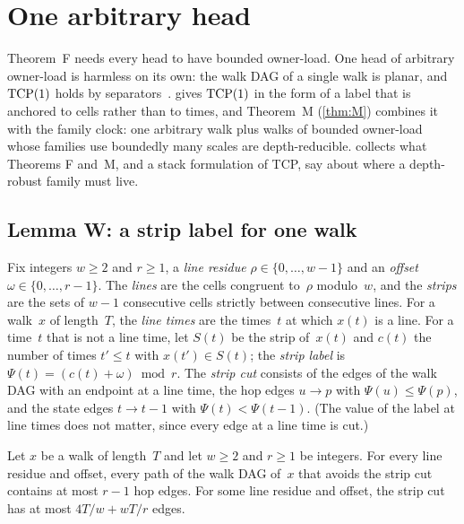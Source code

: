 \section{One arbitrary head}\label{sec:onehead}

Theorem~F needs every head to have bounded owner-load. One head of arbitrary owner-load is harmless on its own: the walk
DAG of a single walk is planar, and $\mathrm{TCP}(1)$ holds by separators~\cite[Section~5.1]{FourthPaper2026}.
 gives $\mathrm{TCP}(1)$ in the form of a label that is anchored to cells rather than to times, and Theorem~M
(\cref{thm:M}) combines it with the family clock: one arbitrary walk plus walks of bounded owner-load whose families use
boundedly many scales are depth-reducible.  collects what Theorems F and~M, and a stack
formulation of TCP, say about where a depth-robust family must live.

\subsection{Lemma W: a strip label for one walk}\label{sec:one-W}

Fix integers $w\ge2$ and $r\ge1$, a \emph{line residue} $\rho\in\{0,\dots,w-1\}$ and an \emph{offset}
$\omega\in\{0,\dots,r-1\}$. The \emph{lines} are the cells congruent to~$\rho$ modulo~$w$, and the \emph{strips} are the
sets of $w-1$ consecutive cells strictly between consecutive lines. For a walk~$x$ of length~$T$, the \emph{line times} are
the times~$t$ at which $x(t)$ is a line. For a time~$t$ that is not a line time, let $S(t)$ be the strip of~$x(t)$ and
$c(t)$ the number of times $t'\le t$ with $x(t')\in S(t)$; the \emph{strip label} is
$\Psi(t)=(c(t)+\omega)\bmod r$. The \emph{strip cut} consists of the edges of the walk DAG with an endpoint at a line time,
the hop edges $u\to p$ with $\Psi(u)\le\Psi(p)$, and the state edges $t\to t-1$ with $\Psi(t)<\Psi(t-1)$. (The value of
the label at line times does not matter, since every edge at a line time is cut.)

\begin{lemma}\label{lem:W}
Let $x$ be a walk of length~$T$ and let $w\ge2$ and $r\ge1$ be integers. For every line residue and offset, every path of
the walk DAG of~$x$ that avoids the strip cut contains at most $r-1$ hop edges. For some line residue and offset, the
strip cut has at most $4T/w+wT/r$ edges.
\end{lemma}

